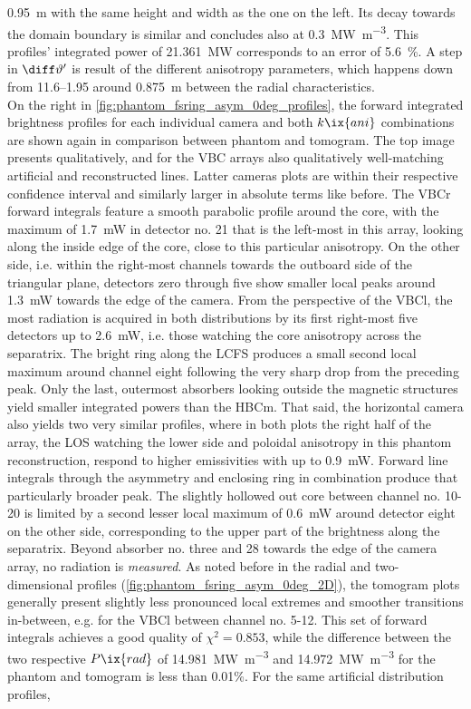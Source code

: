 \SI{0.95}{\meter} with the same height and width as the one on the left. Its decay towards the domain boundary is similar and concludes also at \SI{0.3}{\mega\watt\per\cubic\meter}. This profiles' integrated power of \SI{21.361}{\mega\watt} corresponds to an error of \SI{5.6}{\percent}. A step in $\diff\vartheta^{\prime}$ is result of the different anisotropy parameters, which happens down from \SIrange{11.6}{1.95}{\arbitraryunit} around \SI{0.875}{\meter} between the radial characteristics.\\%
                On the right in \cref{fig:phantom_fsring_asym_0deg_profiles}, the forward integrated brightness profiles for each individual camera and both $k\ix{ani}$ combinations are shown again in comparison between phantom and tomogram. The top image presents qualitatively, and for the VBC arrays also qualitatively well-matching artificial and reconstructed lines. Latter cameras plots are within their respective confidence interval and similarly larger in absolute terms like before. The VBCr forward integrals feature a smooth parabolic profile around the core, with the maximum of \SI{1.7}{\milli\watt} in detector no. 21 that is the left-most in this array, looking along the inside edge of the core, close to this particular anisotropy. On the other side, i.e. within the right-most channels towards the outboard side of the triangular plane, detectors zero through five show smaller local peaks around \SI{1.3}{\milli\watt} towards the edge of the camera. From the perspective of the VBCl, the most radiation is acquired in both distributions by its first right-most five detectors up to \SI{2.6}{\milli\watt}, i.e. those watching the core anisotropy across the separatrix. The bright ring along the LCFS produces a small second local maximum around channel eight following the very sharp drop from the preceding peak. Only the last, outermost absorbers looking outside the magnetic structures yield smaller integrated powers than the HBCm. That said, the horizontal camera also yields two very similar profiles, where in both plots the right half of the array, the LOS watching the lower side and poloidal anisotropy in this phantom reconstruction, respond to higher emissivities with up to \SI{0.9}{\milli\watt}. Forward line integrals through the asymmetry and enclosing ring in combination produce that particularly broader peak. The slightly hollowed out core between channel no. 10-20 is limited by a second lesser local maximum of \SI{0.6}{\milli\watt} around detector eight on the other side, corresponding to the upper part of the brightness along the separatrix. Beyond absorber no. three and 28 towards the edge of the camera array, no radiation is \textit{measured}. As noted before in the radial and two-dimensional profiles (\cref{fig:phantom_fsring_asym_0deg_2D}), the tomogram plots generally present slightly less pronounced local extremes and smoother transitions in-between, e.g. for the VBCl between channel no. 5-12. This set of forward integrals achieves a good quality of $\chi^{2}=0.853$, while the difference between the two respective $P\ix{rad}$ of \SI{14.981}{\mega\watt\per\cubic\meter} and \SI{14.972}{\mega\watt\per\cubic\meter} for the phantom and tomogram is less than 0.01\%. For the same artificial distribution profiles, 